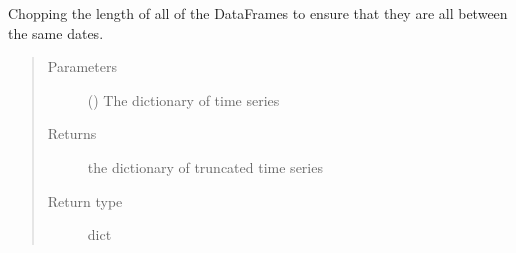 \documentclass[letterpaper,10pt,english]{sphinxmanual}
\begin{document}

\begin{fulllineitems}
\label{\detokenize{index:Forecaster.preprocessing.truncate_window_length}}
Chopping the length of all of the DataFrames to ensure
that they are all between the same dates.
\begin{quote}\begin{description}
\item[{Parameters}] \leavevmode
{} () \textendash{} The dictionary of time series

\item[{Returns}] \leavevmode
the dictionary of truncated time series

\item[{Return type}] \leavevmode
dict

\end{description}\end{quote}

\end{fulllineitems}

\end{document}
